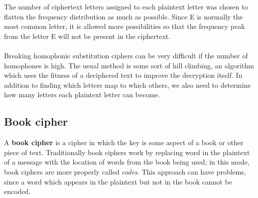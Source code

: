\documentclass[Lau,binding=0.6cm,oneside]{sapthesis}
\begin{document}
The number of ciphertext letters assigned to each plaintext letter was chosen to flatten the frequency distribution as much as possible. Since \textsf{E} is normally the most common letter, it is allowed more possibilities so that the frequency peak from the letter \textsf{E} will not be present in the ciphertext.\\\\
Breaking homophonic substitution ciphers can be very difficult if the number of homophones is high. The usual method is some sort of hill climbing, an algorithm which uses the fitness of a deciphered text to improve the decryption itself. In addition to finding which letters map to which others, we also need to determine how many letters each plaintext letter can become.

\subsection{Book cipher}
A \textbf{book cipher} is a cipher in which the key is some aspect of a book or other piece of text. Traditionally book ciphers work by replacing word in the plaintext of a message with the location of words from the book being used; in this mode, book ciphers are more properly called \textit{codes}. This approach can have problems, since a word which appears in the plaintext but not in the book cannot be encoded\supercite{book_cipher}.\\\\
\end{document}
